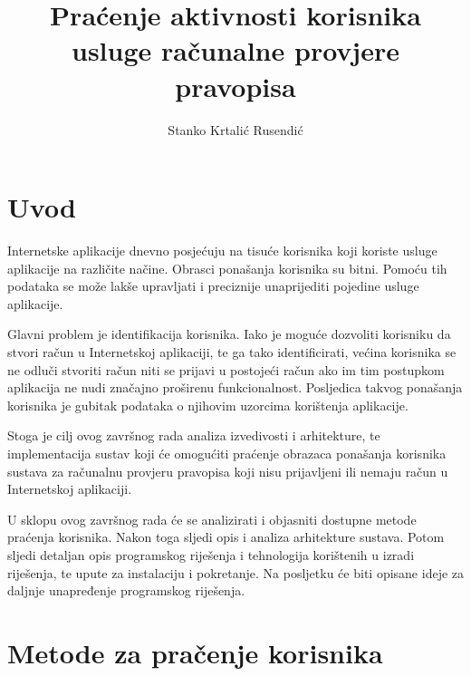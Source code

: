\documentclass[times, utf8, zavrsni]{fer}
\begin{document}

\title{Praćenje aktivnosti korisnika usluge računalne provjere pravopisa}

\author{Stanko Krtalić Rusendić}

\maketitle


\zahvala{}

\tableofcontents

\chapter{Uvod}
Internetske aplikacije dnevno posjećuju na tisuće korisnika koji koriste
usluge aplikacije na različite načine. Obrasci ponašanja korisnika su bitni.
Pomoću tih podataka se može lakše upravljati i preciznije unaprijediti pojedine
usluge aplikacije.

Glavni problem je identifikacija korisnika. Iako je moguće dozvoliti korisniku
da stvori račun u Internetskoj aplikaciji, te ga tako identificirati, većina
korisnika se ne odluči stvoriti račun niti se prijavi u postojeći račun ako im
tim postupkom aplikacija ne nudi značajno proširenu funkcionalnost. Posljedica
takvog ponašanja korisnika je gubitak podataka o njihovim uzorcima korištenja
aplikacije.

Stoga je cilj ovog završnog rada analiza izvedivosti i arhitekture, te
implementacija sustav koji će omogućiti praćenje obrazaca ponašanja korisnika
sustava za računalnu provjeru pravopisa koji nisu prijavljeni ili nemaju račun u
Internetskoj aplikaciji.

U sklopu ovog završnog rada će se analizirati i objasniti dostupne metode
praćenja korisnika. Nakon toga sljedi opis i analiza arhitekture sustava.
Potom sljedi detaljan opis programskog riješenja i tehnologija korištenih u
izradi riješenja, te upute za instalaciju i pokretanje. Na posljetku će biti
opisane ideje za daljnje unapređenje programskog riješenja.

\chapter{Metode za pračenje korisnika}
\end{document}
